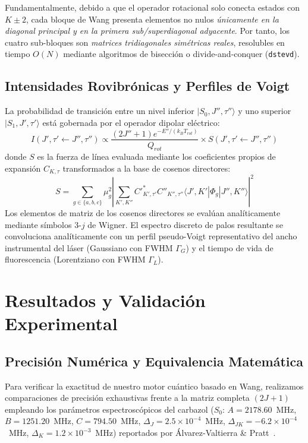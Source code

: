 \documentclass[aps,jcp,reprint,twocolumn,superscriptaddress,showpacs,amsmath,amssymb]{revtex4-2}
\begin{document}
Fundamentalmente, debido a que el operador rotacional solo conecta estados con $K \pm 2$, cada bloque de Wang presenta elementos no nulos \textit{\'unicamente en la diagonal principal y en la primera sub/superdiagonal adyacente}. Por tanto, los cuatro sub-bloques son \textit{matrices tridiagonales sim\'etricas reales}, resolubles en tiempo $O(N)$ mediante algoritmos de bisecci\'on o divide-and-conquer (\texttt{dstevd}).

\subsection{Intensidades Rovibr\'onicas y Perfiles de Voigt}
La probabilidad de transici\'on entre un nivel inferior $|S_0, J'', \tau''\rangle$ y uno superior $|S_1, J', \tau'\rangle$ est\'a gobernada por el operador dipolar el\'ectrico:
\begin{equation}
I(J', \tau' \leftarrow J'', \tau'') \propto \frac{(2J'' + 1) e^{-E'' / (k_B T_{rot})}}{Q_{rot}} \times S(J', \tau' \leftarrow J'', \tau'')
\end{equation}
donde $S$ es la fuerza de l\'inea evaluada mediante los coeficientes propios de expansi\'on $C_{K, \tau}$ transformados a la base de cosenos directores:
\begin{equation}
S = \sum_{g \in \{a, b, c\}} \mu_g^2 \left| \sum_{K', K''} C'^*_{K', \tau'} C''_{K'', \tau''} \langle J', K' | \Phi_g | J'', K'' \rangle \right|^2
\end{equation}
Los elementos de matriz de los cosenos directores se eval\'uan anal\'iticamente mediante s\'imbolos $3$-$j$ de Wigner. El espectro discreto de palos resultante se convoluciona anal\'iticamente con un perfil pseudo-Voigt representativo del ancho instrumental del l\'aser (Gaussiano con FWHM $\Gamma_G$) y el tiempo de vida de fluorescencia (Lorentziano con FWHM $\Gamma_L$).

\section{Resultados y Validaci\'on Experimental}

\subsection{Precisi\'on Num\'erica y Equivalencia Matem\'atica}
Para verificar la exactitud de nuestro motor cu\'antico basado en Wang, realizamos comparaciones de precisi\'on exhaustivas frente a la matriz completa $(2J+1)$ empleando los par\'ametros espectrosc\'opicos del carbazol ($S_0$: $A=2178.60$~MHz, $B=1251.20$~MHz, $C=794.50$~MHz, $\Delta_J=2.5\times 10^{-4}$~MHz, $\Delta_{JK}=-6.2\times 10^{-4}$~MHz, $\Delta_K=1.2\times 10^{-3}$~MHz) reportados por \'Alvarez-Valtierra \& Pratt~\cite{alvarez2006rotationally}.
\end{document}
